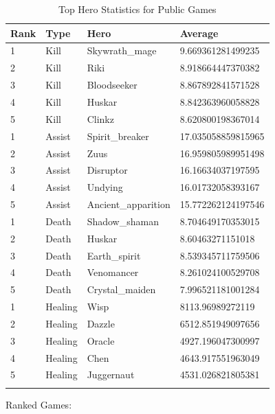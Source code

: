 \documentclass{article}
\begin{document}
\begin{longtable}{|p{1.5cm}|p{2cm}|p{3cm}|p{4.5cm}|}

\hline
\textbf{Rank} & \textbf{Type} & \textbf{Hero} & \textbf{Average} \\
\hline
\endhead

1 & Kill & Skywrath\_mage & 9.669361281499235 \\\hline
2 & Kill & Riki & 8.918664447370382 \\\hline
3 & Kill & Bloodseeker & 8.867892841571528 \\\hline
4 & Kill & Huskar & 8.842363960058828 \\\hline
5 & Kill & Clinkz & 8.620800198367014 \\\hline
1 & Assist & Spirit\_breaker & 17.035058859815965 \\\hline
2 & Assist & Zuus & 16.959805989951498 \\\hline
3 & Assist & Disruptor & 16.16634037197595 \\\hline
4 & Assist & Undying & 16.01732058393167 \\\hline
5 & Assist & Ancient\_apparition & 15.772262124197546 \\\hline
1 & Death & Shadow\_shaman & 8.704649170353015 \\\hline
2 & Death & Huskar & 8.60463271151018 \\\hline
3 & Death & Earth\_spirit & 8.539345711759506 \\\hline
4 & Death & Venomancer & 8.261024100529708 \\\hline
5 & Death & Crystal\_maiden & 7.996521181001284 \\\hline
1 & Healing & Wisp & 8113.96989272119 \\\hline
2 & Healing & Dazzle & 6512.851949097656 \\\hline
3 & Healing & Oracle & 4927.196047300997 \\\hline
4 & Healing & Chen & 4643.917551963049 \\\hline
5 & Healing & Juggernaut & 4531.026821805381 \\\hline

\caption{Top Hero Statistics for Public Games}
\label{top-hero-statistics-for-public-games}
\end{longtable}


Ranked Games:
\end{document}

